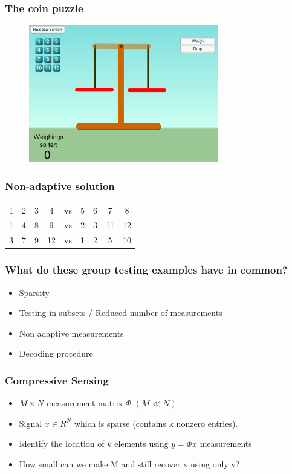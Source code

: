 \documentclass{beamer}
\begin{document}
\begin{frame}
  \frametitle{The coin puzzle}
 \begin{figure}
    \href{http://nrich.maths.org/5796}
         {\includegraphics[height = 6cm]{balance}}
  \end{figure}
\end{frame}

  \begin{frame}
    \frametitle{Non-adaptive solution}
    
 \begin{table}[h]
    \centering
    \begin{tabular}{|c c c c| c | c c c c|}
     1 & 2 & 3 & 4 & vs & 5 & 6 & 7 & 8 \\
     1 & 4 & 8 & 9 & vs & 2 & 3 & 11 & 12 \\
     3 & 7 & 9 & 12 & vs & 1 & 2 & 5 & 10\\
    \end{tabular}
  \end{table}

  \end{frame}

  \begin{frame}
    \frametitle{What do these group testing examples have in common?}


   \begin{itemize}
   \item Sparsity
   \item Testing in subsets / Reduced number of measurements
   \item Non adaptive measurements
   \item Decoding procedure
   \end{itemize}
  \end{frame}

  \begin{frame}
    \frametitle{Compressive Sensing}
    
    \begin{itemize}
    \item $M \times N$ measurement matrix $\Phi$ $(M \ll N)$
    \item Signal $x \in R^N$ which is sparse (contains k nonzero entries).
    \item Identify the location of $k$ elements using $y = \Phi x$ measurements
    \item How small can we make M and still recover x using only y?
    \end{itemize}
  \end{frame}
\end{document}
